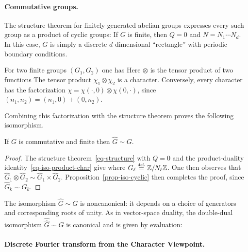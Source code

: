 \paragraph{Commutative groups.}

The structure theorem for finitely generated abelian groups expresses every such group as a product of cyclic groups:
If $G$ is finite, then $Q=0$ and $N=N_1\cdots N_d$. In this case, $G$ is simply a discrete $d$-dimensional ``rectangle'' with periodic boundary conditions.

For two finite groups $(G_1,G_2)$ one has 
Here $\otimes$ is the tensor product of two functions
The tensor product $\chi_1 \otimes \chi_2$ is a character. Conversely, every character has the factorization $\chi=\chi(\cdot,0) \otimes \chi(0,\cdot)$, since $(n_1,n_2)=(n_1,0)+(0,n_2)$.

Combining this factorization with the structure theorem proves the following isomorphism.

\begin{prop}
	If $G$ is commutative and finite then $\hat G \sim G$.
\end{prop}
\begin{proof}
	The structure theorem~\eqref{eq-structure} with $Q=0$ and the product-duality identity~\eqref{eq-iso-product-char} give
	where $G_\ell \stackrel{\mbox{\upshape\tiny def.}}{=} \mathbb{Z}/N_\ell\mathbb{Z}$.
	One then observes that  $\hat G_1 \otimes \hat G_2 \sim \hat G_1 \times \hat G_2$.
	Proposition~\ref{prop-iso-cyclic} then completes the proof, since $\hat G_k \sim G_k$.
\end{proof}

The isomorphism $\hat G \sim G$ is noncanonical: it depends on a choice of generators and corresponding roots of unity. As in vector-space duality, the double-dual isomorphism $\hat{\hat{G}} \sim G$ is canonical and is given by evaluation:

\paragraph{Discrete Fourier transform from the Character Viewpoint.}

